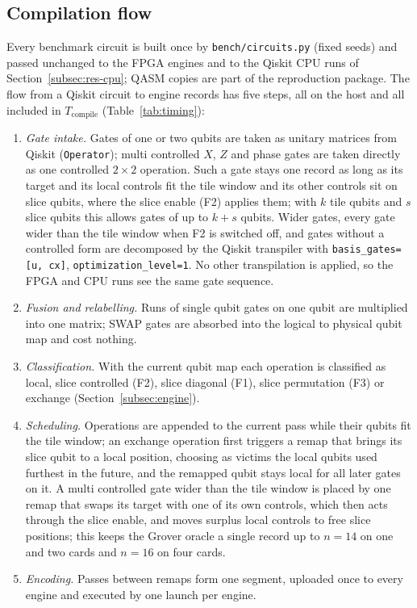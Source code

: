 \subsection{Compilation flow}\label{subsec:compilation}

Every benchmark circuit is built once by \texttt{bench/circuits.py} (fixed seeds) and passed unchanged to the FPGA
engines and to the Qiskit CPU runs of Section~\ref{subsec:res-cpu}; QASM copies are part of the reproduction package.
The flow from a Qiskit circuit to engine records has five steps, all on the host and all included in
$T_{\mathrm{compile}}$ (Table~\ref{tab:timing}):
\begin{enumerate}
\item \emph{Gate intake.} Gates of one or two qubits are taken as unitary matrices from Qiskit
(\texttt{Operator}); multi controlled $X$, $Z$ and phase gates are taken directly as one controlled $2\times2$
operation. Such a gate stays one record as long as its target and its local controls fit the tile window and its
other controls sit on slice qubits, where the slice enable (F2) applies them; with $k$ tile qubits and $s$ slice qubits
this allows gates of up to $k+s$ qubits. Wider gates, every gate wider than the tile window when F2 is switched off,
and gates without a controlled form are decomposed by the Qiskit transpiler with \texttt{basis\_gates=[u, cx]},
\texttt{optimization\_level=1}. No other transpilation is applied, so the
FPGA and CPU runs see the same gate sequence.
\item \emph{Fusion and relabelling.} Runs of single qubit gates on one qubit are multiplied into one matrix; SWAP
gates are absorbed into the logical to physical qubit map and cost nothing.
\item \emph{Classification.} With the current qubit map each operation is classified as local, slice controlled
(F2), slice diagonal (F1), slice permutation (F3) or exchange (Section~\ref{subsec:engine}).
\item \emph{Scheduling.} Operations are appended to the current pass while their qubits fit the tile window;
an exchange operation first triggers a remap that brings its slice qubit to a local position, choosing as victims the
local qubits used furthest in the future, and the remapped qubit stays local for all later gates on it. A multi controlled gate wider than the tile window is placed by one remap that swaps its target with one of
its own controls, which then acts through the slice enable, and moves surplus local controls to free slice positions;
this keeps the Grover oracle a single record up to $n=14$ on one and two cards and $n=16$ on four cards.
\item \emph{Encoding.} Passes between remaps form one segment, uploaded once to every engine and executed by one
launch per engine.
\end{enumerate}

